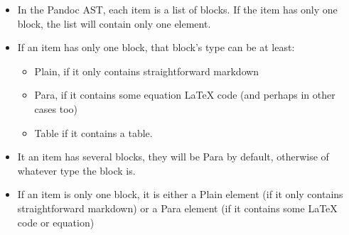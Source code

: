 \begin{itemize}
\tightlist
\item
  In the Pandoc AST, each item is a list of blocks. If the item has only
  one block, the list will contain only one element.
\item
  If an item has only one block, that block's type can be at least:

  \begin{itemize}
  \tightlist
  \item
    Plain, if it only contains straightforward markdown
  \item
    Para, if it contains some equation LaTeX code (and perhaps in other
    cases too)
  \item
    Table if it contains a table.
  \end{itemize}
\item
  It an item has several blocks, they will be Para by default, otherwise
  of whatever type the block is.
\item
  If an item is only one block, it is either a Plain element (if it only
  contains straightforward markdown) or a Para element (if it contains
  some LaTeX code or equation)
\end{itemize}
